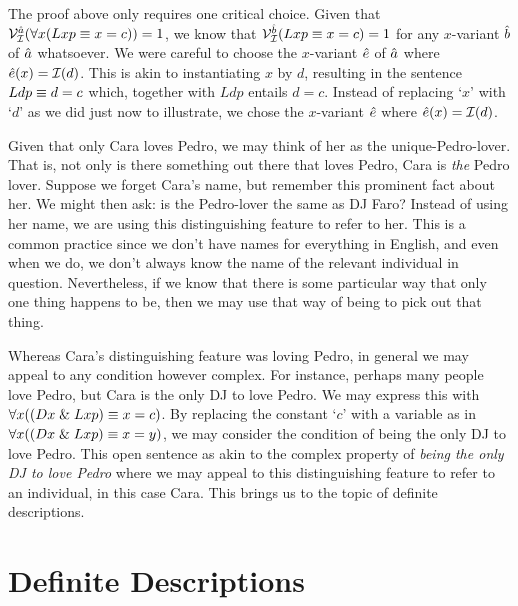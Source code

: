 The proof above only requires one critical choice.
Given that $\mathcal{V}_{\mathcal{I}}^{\hat{a}}(\forall x(Lxp \equiv x=c))=1$, we know that $\mathcal{V}_{\mathcal{I}}^{\hat{b}}(Lxp \equiv x=c)=1$ for any $x$-variant $\hat{b}$ of $\hat{a}$ whatsoever.
We were careful to choose the $x$-variant $\hat{e}$ of $\hat{a}$ where $\hat{e}(x)=\mathcal{I}(d)$.
This is akin to instantiating $x$ by $d$, resulting in the sentence $Ldp \equiv d=c$ which, together with $Ldp$ entails $d=c$.
Instead of replacing `$x$' with `$d$' as we did just now to illustrate, we chose the $x$-variant $\hat{e}$ where $\hat{e}(x)=\mathcal{I}(d)$.

Given that only Cara loves Pedro, we may think of her as the unique-Pedro-lover.
That is, not only is there something out there that loves Pedro, Cara is \textit{the} Pedro lover.
Suppose we forget Cara's name, but remember this prominent fact about her.
We might then ask: is the Pedro-lover the same as DJ Faro?
Instead of using her name, we are using this distinguishing feature to refer to her.
This is a common practice since we don't have names for everything in English, and even when we do, we don't always know the name of the relevant individual in question.
Nevertheless, if we know that there is some particular way that only one thing happens to be, then we may use that way of being to pick out that thing.

Whereas Cara's distinguishing feature was loving Pedro, in general we may appeal to any condition however complex.
For instance, perhaps many people love Pedro, but Cara is the only DJ to love Pedro.
We may express this with $\forall x((Dx \mathrel\& Lxp) \equiv x=c)$.
By replacing the constant `$c$' with a variable as in $\forall x((Dx \mathrel\& Lxp) \equiv x=y)$, we may consider the condition of being the only DJ to love Pedro.
This open sentence as akin to the complex property of \textit{being the only DJ to love Pedro} where we may appeal to this distinguishing feature to refer to an individual, in this case Cara.
This brings us to the topic of definite descriptions.





\section{Definite Descriptions}
  \label{sec.DefiniteDescription}

